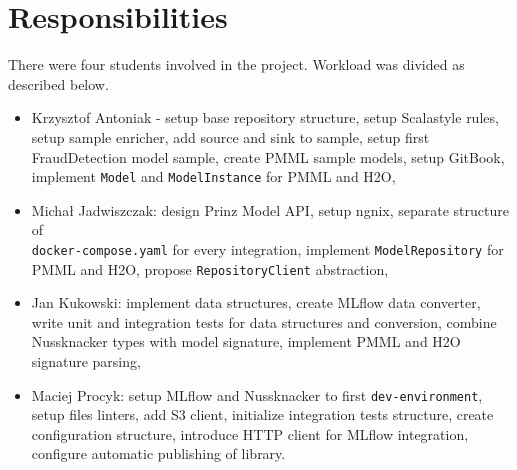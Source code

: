 \chapter{Responsibilities}
\label{chap:responsibilities}

There were four students involved in the project.
Workload was divided as described below.

\begin{itemize}
    \item Krzysztof Antoniak - setup base repository structure, setup Scalastyle rules, setup sample enricher, add source and sink to sample,
    setup first FraudDetection model sample, create PMML sample models, setup GitBook, implement \texttt{Model} and \texttt{ModelInstance} for PMML and H2O,
    \item Michał Jadwiszczak: design Prinz Model API, setup ngnix, separate structure of  \\ \texttt{docker-compose.yaml} for every integration,
    implement \texttt{ModelRepository} for PMML and H2O, propose \texttt{RepositoryClient} abstraction,
    \item Jan Kukowski: implement data structures, create MLflow data converter, write unit and integration tests
    for data structures and conversion, combine Nussknacker types with model signature, implement PMML and H2O signature parsing,
    \item Maciej Procyk: setup MLflow and Nussknacker to first \texttt{dev-environment}, setup files linters,
    add S3 client, initialize integration tests structure, create configuration structure, introduce HTTP client for MLflow integration,
    configure automatic publishing of library.
\end{itemize}
